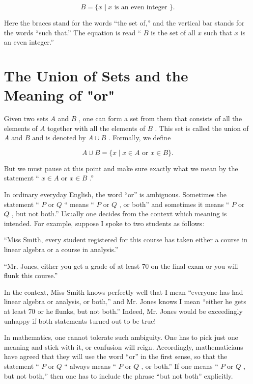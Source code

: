 \[
B = \{ x \mid  x\text{ is an even integer }\} .
\]

Here the braces stand for the words ``the set of,'' and the vertical bar stands for the words ``such that.'' The equation is read `` \(B\) is the set of all \(x\) such that \(x\) is an even integer.''

\section*{The Union of Sets and the Meaning of "or"}

Given two sets \(A\) and \(B\) , one can form a set from them that consists of all the elements of \(A\) together with all the elements of \(B\) . This set is called the union of \(A\) and \(B\) and is denoted by \(A \cup  B\) . Formally, we define

\[
A \cup  B = \{ x \mid  x \in  A\text{ or }x \in  B\} .
\]

But we must pause at this point and make sure exactly what we mean by the statement `` \(x \in  A\) or \(x \in  B\) .''

In ordinary everyday English, the word ``or'' is ambiguous. Sometimes the statement `` \(P\) or \(Q\) `` means `` \(P\) or \(Q\) , or both'' and sometimes it means `` \(P\) or \(Q\) , but not both.'' Usually one decides from the context which meaning is intended. For example, suppose I spoke to two students as follows:

\begin{centeredblock}
``Miss Smith, every student registered for this course has taken either a course in linear algebra or a course in analysis.''

``Mr. Jones, either you get a grade of at least 70 on the final exam or you will flunk this course.''
\end{centeredblock}

In the context, Miss Smith knows perfectly well that I mean ``everyone has had linear algebra or analysis, or both,'' and Mr. Jones knows I mean ``either he gets at least 70 or he flunks, but not both.'' Indeed, Mr. Jones would be exceedingly unhappy if both statements turned out to be true!

In mathematics, one cannot tolerate such ambiguity. One has to pick just one meaning and stick with it, or confusion will reign. Accordingly, mathematicians have agreed that they will use the word ``or'' in the first sense, so that the statement `` \(P\) or \(Q\) `` always means `` \(P\) or \(Q\) , or both.'' If one means `` \(P\) or \(Q\) , but not both,'' then one has to include the phrase ``but not both'' explicitly.

